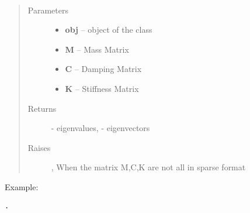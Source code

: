\documentclass[letterpaper,10pt,english]{sphinxmanual}
\begin{document}
\begin{fulllineitems}
\label{index:brake.solve.solver.qev_sparse}~\begin{quote}\begin{description}
\item[{Parameters}] \leavevmode\begin{itemize}
\item {} 
\textbf{obj} -- object of the class 

\item {} 
\textbf{M} -- Mass Matrix

\item {} 
\textbf{C} -- Damping Matrix

\item {} 
\textbf{K} -- Stiffness Matrix

\end{itemize}

\item[{Returns}] \leavevmode
{} - eigenvalues,  - eigenvectors

\item[{Raises }] \leavevmode
{}, When the matrix M,C,K are not all in sparse format

\end{description}\end{quote}

Example:

\begin{Verbatim}[commandchars=\\\{\}]
.
\end{Verbatim}

\end{fulllineitems}



\end{document}
